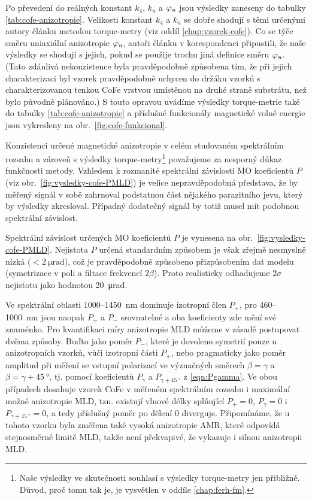 Po převedení do reálných konstant $k_4$, $k_u$ a $\varphi_u$ jsou výsledky zaneseny do tabulky \ref{tab:cofe-anizotropie}.
Velikosti konstant $k_4$ a $k_u$ se dobře shodují s těmi určenými autory článku \cite{zengIntrinsicMechanismAnisotropic2020} metodou torque-metry (viz oddíl \ref{chap:vzorek-cofe}).
Co se týče směru uniaxiální anizotropie $\varphi_u$, autoři článku \cite{zengIntrinsicMechanismAnisotropic2020} v korespondenci \cite{wuUstniSdeleni} připustili, že naše výsledky se shodují s jejich, pokud se použije trochu jiná definice směru $\varphi_u$.
(Tato zdánlivá nekonzistence byla pravděpodobně způsobena tím, že při jejich charakterizaci byl vzorek pravděpodobně uchycen do držáku vzorků s charakterizovanou tenkou CoFe vrstvou umístěnou na druhé straně substrátu, než bylo původně plánováno.)
S touto opravou uvádíme výsledky torque-metrie také do tabulky \ref{tab:cofe-anizotropie} a příslušné funkcionály magnetické volné energie jsou vykresleny na obr.~\ref{fig:cofe-funkcional}.

Konzistenci určené magnetické anizotropie v celém studovaném spektrálním rozsahu a zároveň s výsledky torque-metry\footnote{Naše výsledky ve skutečnosti souhlasí s výsledky torque-metry jen přibližně. Důvod, proč tomu tak je, je vysvětlen v oddíle \ref{chap:ferh-fm}.} považujeme za nesporný důkaz funkčnosti metody.
Vzhledem k rozmanité spektrální závislosti MO koeficientů $P$ (viz obr.~\ref{fig:vysledky-cofe-PMLD}) je velice nepravděpodobná představa, že by měřený signál v sobě zahrnoval podstatnou část nějakého parazitního jevu, který by výsledky zkresloval.
Případný dodatečný signál by totiž musel mít podobnou spektrální závislost.

Spektrální závislost určených MO koeficientů $P$ je vynesena na obr.~\ref{fig:vysledky-cofe-PMLD}.
Nejistota $P$ určená standardním způsobem je však zřejmě nesmyslně nízká ($<\SI{2}{\micro\radian}$), což je pravděpodobně způsobeno přizpůsobením dat modelu (symetrizace v poli a filtace frekvencí $2\beta$).
Proto realisticky odhadujeme $2\sigma$ nejistotu jako hodnotou \SI{20}{\micro\radian}.

Ve spektrální oblasti \num{1000}--\SI{1450}{\nano\meter} dominuje izotropní člen $P_+$, pro \num{460}--\SI{1000}{\nano\meter} jsou naopak $P_+$ a $P_-$ srovnatelné a oba koeficienty zde mění své znaménko.
Pro kvantifikaci míry anizotropie MLD můžeme v zásadě postupovat dvěma způsoby.
Buďto jako poměr $P_-$, které je dovoleno symetrií pouze u anizotropních vzorků, vůči izotropní části $P_+$, nebo pragmaticky jako poměr amplitud při měření se vstupní polarizací ve význačných směrech $\beta=\gamma$ a $\beta=\gamma+\SI{45}{\degree}$, tj. pomocí koeficientů $P_\gamma$ a $P_{\gamma+\SI{45}{\degree}}$ z \eqref{eqn:Pgamma}.
Ve obou případech dosahuje vzorek CoFe v měřeném spektrálním rozsahu i maximální možné anizotropie MLD, tzn. existují vlnové délky splňující $P_+=0$, $P_\gamma=0$ i $P_{\gamma+\SI{45}{\degree}}=0$, a tedy příslušný poměr po dělení $0$ diverguje.
Připomínáme, že u tohoto vzorku byla změřena\cite{zengIntrinsicMechanismAnisotropic2020} také vysoká anizotropie AMR, které odpovídá stejnosměrné limitě MLD, takže není překvapivé, že vykazuje i silnou anizotropii MLD.


